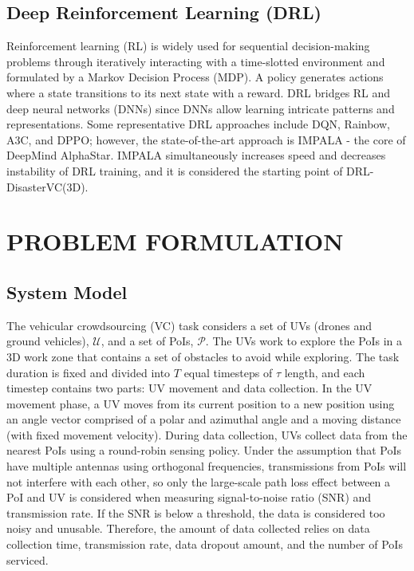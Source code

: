 \documentclass[sigconf, natbib=false]{acmart}
\newcommand{\UV}{\mathcal{U}}
\newcommand{\PoI}{\mathcal{P}}
\begin{document}
   \subsection{Deep Reinforcement Learning (DRL)}
   Reinforcement learning (RL) is widely used for sequential decision-making problems through iteratively interacting with a time-slotted environment and formulated by a Markov Decision Process (MDP). A policy generates actions where a state transitions to its next state with a reward. DRL bridges RL and deep neural networks (DNNs) since DNNs allow learning intricate patterns and representations. Some representative DRL approaches include DQN, Rainbow, A3C, and DPPO; however, the state-of-the-art approach is IMPALA - the core of DeepMind AlphaStar. IMPALA simultaneously increases speed and decreases instability of DRL training, and it is considered the starting point of DRL-DisasterVC(3D).

   \section{PROBLEM FORMULATION}
   \subsection{System Model}
   The vehicular crowdsourcing (VC) task considers a set of UVs (drones and ground vehicles), $\UV$, and a set of PoIs, $\PoI$. The UVs work to explore the PoIs in a 3D work zone that contains a set of obstacles to avoid while exploring. The task duration is fixed and divided into $T$ equal timesteps of $\tau$ length, and each timestep contains two parts: UV movement and data collection. In the UV movement phase, a UV moves from its current position to a new position using an angle vector comprised of a polar and azimuthal angle and a moving distance (with fixed movement velocity). During data collection, UVs collect data from the nearest PoIs using a round-robin sensing policy. Under the assumption that PoIs have multiple antennas using orthogonal frequencies, transmissions from PoIs will not interfere with each other, so only the large-scale path loss effect between a PoI and UV is considered when measuring signal-to-noise ratio (SNR) and transmission rate. If the SNR is below a threshold, the data is considered too noisy and unusable. Therefore, the amount of data collected relies on data collection time, transmission rate, data dropout amount, and the number of PoIs serviced.
\end{document}
